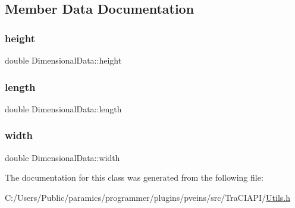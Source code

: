 \subsection{Member Data Documentation}
\mbox{\label{class_dimensional_data_ad5deedd58ab9d79954d33780f0e2fce2}} 
\subsubsection{\texorpdfstring{height}{height}}
{\footnotesize\ttfamily double Dimensional\+Data\+::height}

\mbox{\label{class_dimensional_data_a07f712bbdabdc7cadc671feb480065a4}} 
\subsubsection{\texorpdfstring{length}{length}}
{\footnotesize\ttfamily double Dimensional\+Data\+::length}

\mbox{\label{class_dimensional_data_a5ed5474d8c61c0871189f083c76a39f9}} 
\subsubsection{\texorpdfstring{width}{width}}
{\footnotesize\ttfamily double Dimensional\+Data\+::width}



The documentation for this class was generated from the following file\+:\begin{DoxyCompactItemize}
\item 
C\+:/\+Users/\+Public/paramics/programmer/plugins/pveins/src/\+Tra\+C\+I\+A\+P\+I/\hyperlink{_utils_8h}{Utils.\+h}\end{DoxyCompactItemize}
